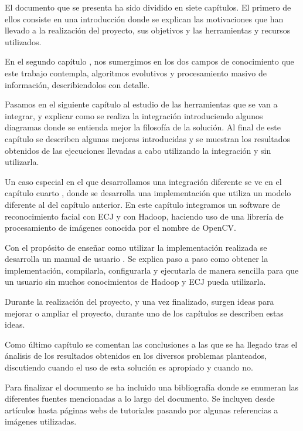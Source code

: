 El documento que se presenta ha sido dividido en siete cap\'itulos. El primero de ellos consiste en una introducci\'on  donde se explican las motivaciones que han llevado a la realizaci\'on del proyecto, sus objetivos y las herramientas y recursos utilizados.

En el segundo cap\'itulo , nos sumergimos en los dos campos de conocimiento que este trabajo contempla, algoritmos evolutivos y procesamiento masivo de informaci\'on, describiendolos con detalle.

Pasamos en el siguiente cap\'itulo  al estudio de las herramientas que se van a integrar, y explicar como se realiza la integraci\'on introduciendo algunos diagramas donde se entienda mejor la filosofía de la solución. Al final de este cap\'itulo se describen algunas mejoras introducidas y se muestran los resultados obtenidos de las ejecuciones llevadas a cabo utilizando la integraci\'on y sin utilizarla.

Un caso especial en el que desarrollamos una integraci\'on diferente se ve en el cap\'itulo cuarto , donde se desarrolla una implementaci\'on que utiliza un modelo diferente al del cap\'itulo anterior. En este cap\'itulo integramos un software de reconocimiento facial con ECJ y con Hadoop, haciendo uso de una librer\'ia de procesamiento de im\'agenes conocida por el nombre de OpenCV.

Con el prop\'osito de ense\~nar como utilizar la implementaci\'on realizada se desarrolla un manual de usuario . Se explica paso a paso como obtener la implementaci\'on, compilarla, configurarla y ejecutarla de manera sencilla para que un usuario sin muchos conocimientos de Hadoop y ECJ pueda utilizarla.

Durante la realizaci\'on del proyecto, y una vez finalizado, surgen ideas para mejorar o ampliar el proyecto,  durante uno de los cap\'itulos  se describen estas ideas.

Como \'ultimo cap\'itulo  se comentan las conclusiones a las que se ha llegado tras el \'analisis de los resultados obtenidos en los diversos problemas planteados, discutiendo cuando el uso de esta soluci\'on es apropiado y cuando no.

Para finalizar el documento se ha incluido una bibliografía donde se enumeran las diferentes fuentes mencionadas a lo largo del documento. Se incluyen desde art\'iculos hasta p\'aginas webs de tutoriales pasando por algunas referencias a im\'agenes utilizadas.